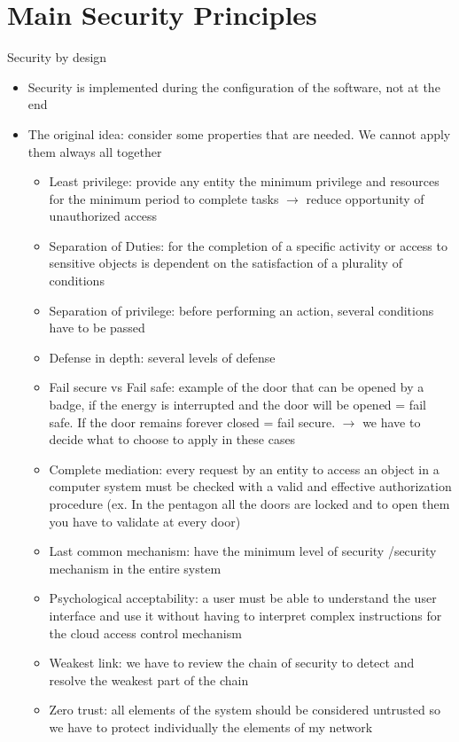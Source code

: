 \documentclass{article}
\begin{document}
\section{Main Security Principles}
Security by design
  \begin{itemize}
    \item Security is implemented during the configuration of the software, not at the end
    \item The original idea: consider some properties that are needed. We cannot apply them always all together
      \begin{itemize}
        \item Least privilege: provide any entity the minimum privilege and resources for the minimum period to complete tasks $\rightarrow$ reduce opportunity of unauthorized access
        \item Separation of Duties: for the completion of a specific activity or access to sensitive objects is dependent on the satisfaction of a plurality of conditions 
        \item Separation of privilege: before performing an action, several conditions have to be passed
        \item Defense in depth: several levels of defense 
        \item Fail secure vs Fail safe: example of the door that can be opened by a badge, if the energy is interrupted and the door will be opened = fail safe. If the door remains forever closed = fail secure. $\rightarrow$ we have to decide what to choose to apply in these cases  
        \item Complete mediation: every request by an entity to access an object in a computer system must be checked with a valid and effective authorization procedure (ex. In the pentagon all the doors are locked and to open them you have to validate at every door)
        \item Last common mechanism: have the minimum level of security /security mechanism in the entire system
        \item Psychological acceptability: a user must be able to understand the user interface and use it without having to interpret complex instructions for the cloud access control mechanism
        \item Weakest link: we have to review the chain of security to detect and resolve the weakest part of the chain
        \item Zero trust: all elements of the system should be considered untrusted so we have to protect individually the elements of my network
      \end{itemize}
  \end{itemize}
\end{document}
